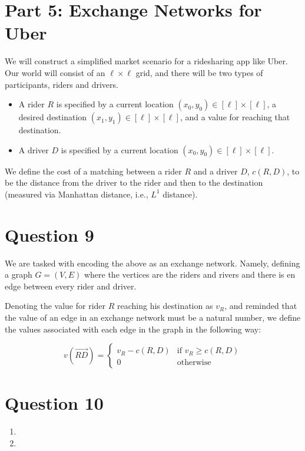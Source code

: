 \documentclass{article}
\begin{document}
\section*{Part 5: Exchange Networks for Uber}
\setcounter{section}{0}
We will construct a simplified market scenario for a ridesharing app like Uber. Our world will consist of an $\ell \times \ell$ grid, and there will be two types of participants, riders and drivers.

\begin{itemize}
    \item A rider $R$ is specified by a current location $(x_0, y_0) \in [\ell] \times [\ell]$, a desired destination $(x_1, y_1) \in [\ell] \times [\ell]$, and a value for reaching that destination.
    \item A driver $D$ is specified by a current location $(x_0, y_0) \in [\ell] \times [\ell]$.
\end{itemize}

We define the cost of a matching between a rider $R$ and a driver $D$, $c(R, D)$, to be the distance from the driver to the rider and then to the destination (measured via Manhattan distance, i.e., $L^1$ distance).

\section{Question 9}
We are tasked with encoding the above as an exchange network. Namely, defining a graph $G = (V, E)$ where the vertices are the riders and rivers and there is en edge between every rider and driver.

Denoting the value for rider $R$ reaching his destination as $v_R$, and reminded that the value of an edge in an exchange network must be a natural number, we define the values associated with each edge in the graph in the following way:

\begin{equation*}
    v(\overrightarrow{RD}) = \begin{cases}
        v_R - c(R, D) & \text{if } v_R \geq c(R, D) \\
        0 & \text{otherwise}
    \end{cases}
\end{equation*}


\section{Question 10}

\begin{enumerate}[label=(\alph*)]

    \item 

    
    \item 


\end{enumerate}
\end{document}

